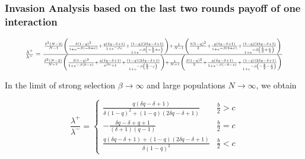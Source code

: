 \documentclass[11pt]{article}
\theoremstyle{plainCl1}
\theoremstyle{plainCl2}
\begin{document}
\subsubsection*{Invasion Analysis based on the last two rounds payoff of one interaction}

\begin{equation}
  \resizebox{.9\textwidth}{!}
  {%
  $\frac{\lambda^{+}}{\lambda^{-}} =
  \frac{\frac{\delta^{2} \left(N - 2\right)}{N-1} \left(\frac{\delta \left(1 - q\right)^{2}}{1 + e^{- \beta \left(- b + c\right)}} + \frac{q \left(\delta q - \delta + 1\right)}{1 + e^{- \beta c}} + \frac{\left(1 - q\right) \left(2 \delta q - \delta + 1\right)}{1 + e^{- \beta \left(- \frac{b}{2} + c\right)}}\right) + \frac{1}{N-1}\left(\frac{\delta \left(1 - q\right)^{2}}{2} + \frac{q \left(\delta q - \delta + 1\right)}{1 + e^{- \beta \left(b + c\right)}} + \frac{\left(1 - q\right) \left(2 \delta q - \delta + 1\right)}{1 + e^{- \beta \left(\frac{b}{2} + \frac{c}{2}\right)}}\right)}
  {\frac{\delta^{2} \left(N - 2\right)}{N-1} \left(\frac{\delta \left(1 - q\right)^{2}}{1 + e^{- \beta \left(b - c\right)}} + \frac{q \left(\delta q - \delta + 1\right)}{e^{\beta c} + 1} + \frac{\left(1 - q\right) \left(2 \delta q - \delta + 1\right)}{1 + e^{- \beta \left(\frac{b}{2} - c\right)}}\right) + \frac{1}{N-1} \left(\frac{\delta \left(1 - q\right)^{2}}{2} + \frac{q \left(\delta q - \delta + 1\right)}{1 + e^{- \beta \left(- b - c\right)}} + \frac{\left(1 - q\right) \left(2 \delta q - \delta + 1\right)}{1 + e^{- \beta \left(- \frac{b}{2} - \frac{c}{2}\right)}}\right)}
  $}
\end{equation}

In the limit of strong selection \(\beta \rightarrow \infty\) and
large populations \(N \rightarrow \infty \), we obtain

\begin{equation}
\frac{\lambda^{+}}{\lambda^{-}} = 
\begin{cases}
  \frac{q \left(\delta q - \delta + 1\right)}{\delta \left(1 - q\right)^{2} + \left(1 - q\right) \left(2 \delta q - \delta + 1\right)}  & \frac{b}{2} > c \\
  - \frac{\delta q - \delta + q + 1}{\left(\delta + 1\right) \left(q - 1\right)}  & \frac{b}{2} = c \\
  \frac{q \left(\delta q - \delta + 1\right) + \left(1 - q\right) \left(2 \delta q - \delta + 1\right)}{\delta \left(1 - q\right)^{2}} & \frac{b}{2} < c
\end{cases}
\end{equation}
\end{document}
